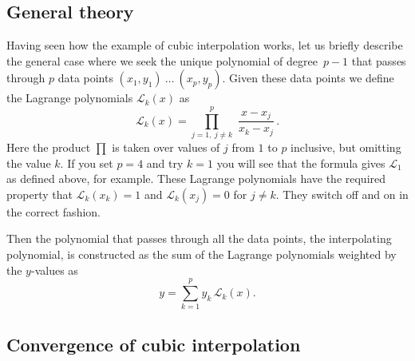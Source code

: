 \subsection{General theory}

Having seen how the example of cubic interpolation works, let us briefly describe the general 
case where we seek the unique polynomial of degree~$p-1$ that passes through $p$ data points
$(x_1, y_1)\ \ldots \ (x_{p}, y_{p})$. Given these data points we define the Lagrange polynomials
$\mathcal{L}_k (x)$ as 
%
\begin{equation}
\mathcal{L}_k (x) = \prod_{j=1,\ j \ne k}^p \, \, \frac{x - x_j}{x_k - x_j}\, . 
\end{equation}
%
%
Here the product $\prod$ is taken over values of $j$ from $1$ to $p$ inclusive, but omitting the value $k$. If you set $p=4$ and try $k=1$ you will
see that the formula gives $\mathcal{L}_1$ as defined above, for example. These Lagrange polynomials have the required property that 
$\mathcal{L}_k(x_k)=1$ and $\mathcal{L}_k(x_j)=0$ for $j\neq k$. They switch off and on in the correct fashion. 

Then the polynomial that passes through all the data points, the interpolating polynomial, is constructed as the sum of the Lagrange polynomials 
weighted by the $y$-values as 
%
\begin{equation}
\label{eq:lagrange_interp}
y = \sum_{k=1}^{p} y_k\,  \mathcal{L}_k (x) .
\end{equation}



\vspace{5mm}

\subsection{Convergence of cubic interpolation} 


